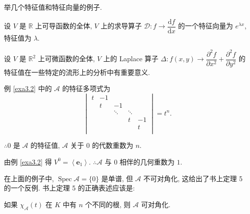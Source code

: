 \documentclass[color=black,device=normal,lang=cn,mode=geye]{elegantnote}
\begin{document}
举几个特征值和特征向量的例子.
\begin{example}
    设 $V$ 是 $\mathbb{R}$ 上可导函数的全体, $V$ 上的求导算子 $\mathcal{D}:f\to \dfrac{\mathrm{d}f}{\mathrm{d}x}$ 的一个特征向量为 $e^{\lambda x}$, 特征值为 $\lambda$.
\end{example}
\begin{example}
    设 $V$ 是 $\mathbb{R}^2$ 上可微函数的全体, $V$ 上的 Laplace 算子 $\Delta:f(x,y)\to\dfrac{\partial^2f}{\partial x^2}+\dfrac{\partial^2f}{\partial y^2}$ 的特征值在一些特定的流形上的分析中有重要意义.
\end{example}
\begin{example}
    例 \ref{exa3.2} 中的 $\mathcal{A}$ 的特征多项式为
    \[\begin{vmatrix}
        t & -1 \\
        & t & -1 \\
        && \ddots & \ddots \\
        &&& t & -1 \\
        &&&& t \\
    \end{vmatrix}=t^n.\]

    $\therefore0$ 是 $\mathcal{A}$ 的特征值, $\mathcal{A}$ 关于 $0$ 的代数重数为 $n$.

    由例 \ref{exa3.2} 得 $V^0=\left<\boldsymbol{e}_1\right>$. $\therefore\mathcal{A}$ 与 $0$ 相伴的几何重数为 $1$.
\end{example}
在上面的例子中, $\operatorname{Spec}\mathcal{A}=\{0\}$ 是单谱, 但 $\mathcal{A}$ 不可对角化, 这给出了书上定理 5 的一个反例. 书上定理 5 的正确表述应该是:
\begin{theorem}\label{t3.2}
    如果 $\chi_{\mathcal{A}}(t)$ 在 $K$ 中有 $n$ 个不同的根, 则 $\mathcal{A}$ 可对角化.
\end{theorem}
\end{document}
